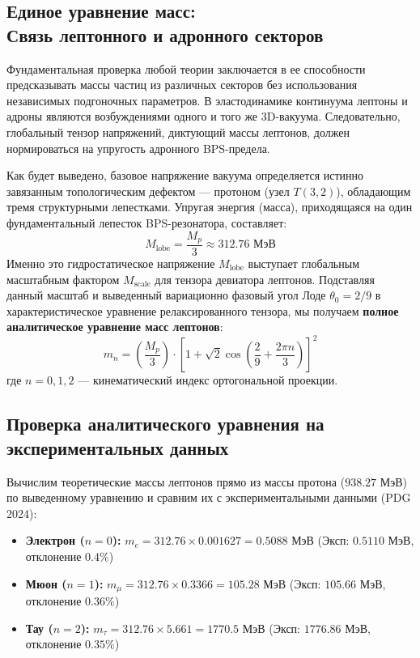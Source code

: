 \documentclass[12pt,a4paper]{article}
\begin{document}
	\subsection{Единое уравнение масс:\\ Связь лептонного и адронного секторов}
	Фундаментальная проверка любой теории заключается в ее способности предсказывать массы частиц из различных секторов без использования независимых подгоночных параметров. В эластодинамике континуума лептоны и адроны являются возбуждениями одного и того же 3D-вакуума. Следовательно, глобальный тензор напряжений, диктующий массы лептонов, должен нормироваться на упругость адронного BPS-предела.
	
	Как будет выведено, базовое напряжение вакуума определяется истинно завязанным топологическим дефектом — протоном (узел $T(3,2)$), обладающим тремя структурными лепестками. Упругая энергия (масса), приходящаяся на один фундаментальный лепесток BPS-резонатора, составляет:
	\begin{equation}
		M_{\text{lobe}} = \frac{M_p}{3} \approx 312.76 \text{ МэВ}
	\end{equation}
	Именно это гидростатическое напряжение $M_{\text{lobe}}$ выступает глобальным масштабным фактором $M_{\text{scale}}$ для тензора девиатора лептонов. Подставляя данный масштаб и выведенный вариационно фазовый угол Лоде $\theta_0 = 2/9$ в характеристическое уравнение релаксированного тензора, мы получаем \textbf{полное аналитическое уравнение масс лептонов}:
	\begin{equation}
		m_n = \left( \frac{M_p}{3} \right) \cdot \left[ 1 + \sqrt{2}\cos\left(\frac{2}{9} + \frac{2\pi n}{3}\right) \right]^2
	\end{equation}
	где $n = 0, 1, 2$ — кинематический индекс ортогональной проекции.
	
	\subsection{Проверка аналитического уравнения на экспериментальных данных}
	Вычислим теоретические массы лептонов прямо из массы протона ($938.27$ МэВ) по выведенному уравнению и сравним их с экспериментальными данными (PDG 2024):
	\begin{itemize}
		\item \textbf{Электрон ($n=0$):} $m_e = 312.76 \times 0.001627 = \mathbf{0.5088 \text{ МэВ}}$ (Эксп: $0.5110 \text{ МэВ}$, отклонение $0.4\%$)
		\item \textbf{Мюон ($n=1$):} $m_\mu = 312.76 \times 0.3366 = \mathbf{105.28 \text{ МэВ}}$ (Эксп: $105.66 \text{ МэВ}$, отклонение $0.36\%$)
		\item \textbf{Тау ($n=2$):} $m_\tau = 312.76 \times 5.661 = \mathbf{1770.5 \text{ МэВ}}$ (Эксп: $1776.86 \text{ МэВ}$, отклонение $0.35\%$)
	\end{itemize}
	
\end{document}
